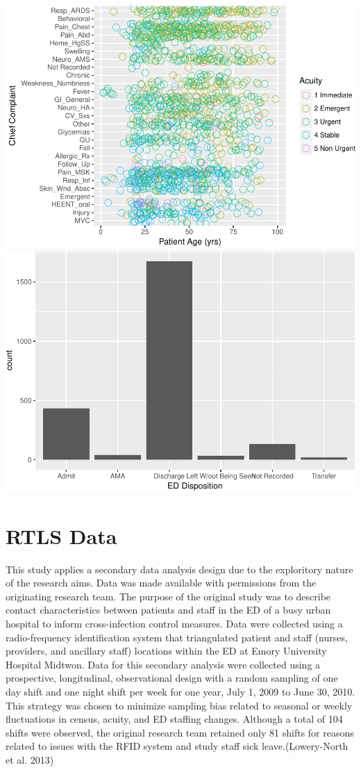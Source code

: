 \documentclass[]{elsarticle} %
\makeatletter
\def\maxwidth{\ifdim\Gin@nat@width>\linewidth\linewidth
\else\Gin@nat@width\fi}
\let\Oldincludegraphics\includegraphics
\renewcommand{\includegraphics}[1]{\Oldincludegraphics[width=\maxwidth]{#1}}
\makeatother
\begin{document}
\includegraphics{Flynn_Project_files/figure-latex/Chief Complaint-1.pdf}
\includegraphics{Flynn_Project_files/figure-latex/Chief Complaint-2.pdf}

\section{RTLS Data}\label{rtls-data}

This study applies a secondary data analysis design due to the
exploritory nature of the research aims. Data was made available with
permissions from the originating research team. The purpose of the
original study was to describe contact characteristics between patients
and staff in the ED of a busy urban hospital to inform cross-infection
control measures. Data were collected using a radio-frequency
identification system that triangulated patient and staff (nurses,
providers, and ancillary staff) locations within the ED at Emory
University Hospital Midtwon. Data for this secondary analysis were
collected using a prospective, longitudinal, observational design with a
random sampling of one day shift and one night shift per week for one
year, July 1, 2009 to June 30, 2010. This strategy was chosen to
minimize sampling bias related to seasonal or weekly fluctuations in
census, acuity, and ED staffing changes. Although a total of 104 shifts
were observed, the original research team retained only 81 shifts for
reasons related to issues with the RFID system and study staff sick
leave.(Lowery-North et al. 2013)
\end{document}
